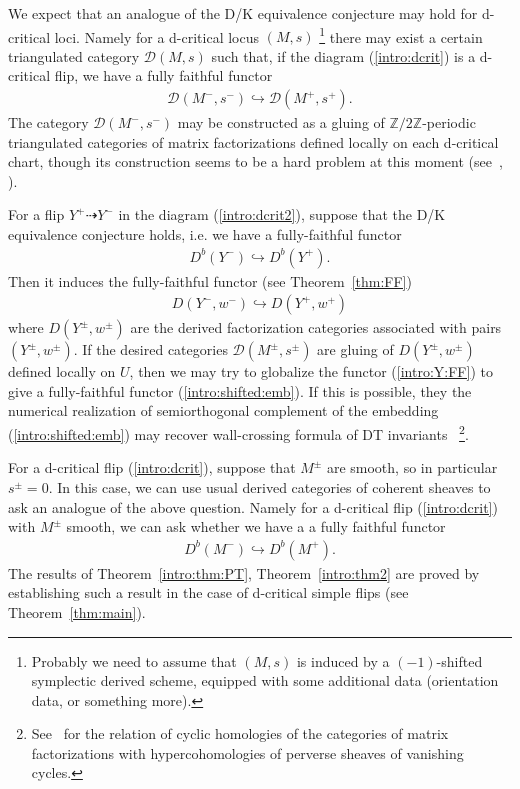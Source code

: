 \documentclass[11pt]{amsart}
\theoremstyle{plain}
\newcommand{\dD}{\mathcal{D}}
\begin{document}
We expect that an analogue of the D/K equivalence 
conjecture 
may hold 
for d-critical 
loci. 
 Namely 
for a d-critical locus $(M, s)$ 
\footnote{Probably we need to assume that 
$(M, s)$ is 
induced by a $(-1)$-shifted symplectic
derived scheme,
equipped 
with some additional data (orientation data, or something more). }
there may exist a certain 
triangulated category $\dD(M, s)$ such that, 
if the diagram (\ref{intro:dcrit}) is a d-critical flip, we have 
a fully faithful functor
\begin{align}\label{intro:shifted:emb}
\dD(M^{-}, s^{-}) \hookrightarrow 
\dD(M^{+}, s^{+}).
\end{align}
The category $\dD(M^{-}, s^{-})$ may be 
constructed as a gluing of 
$\mathbb{Z}/2\mathbb{Z}$-periodic triangulated categories of 
matrix factorizations
defined locally on each d-critical chart, 
though its construction seems to be a hard 
problem at this moment 
(see~\cite[(J)]{Jslide}, \cite[Section~6.1]{MR3728637}). 

For a flip $Y^+ \dashrightarrow Y^-$ 
in the diagram (\ref{intro:dcrit2}), suppose that 
the D/K equivalence conjecture holds, i.e. 
we have a fully-faithful functor 
\begin{align*}
D^b(Y^-) \hookrightarrow D^b(Y^+).
\end{align*}
Then it induces the fully-faithful functor
(see Theorem~\ref{thm:FF})
\begin{align}\label{intro:Y:FF}
D(Y^-, w^-) \hookrightarrow D(Y^+, w^+)
\end{align}
where $D(Y^{\pm}, w^{\pm})$ are the 
derived factorization categories associated with 
pairs $(Y^{\pm}, w^{\pm})$. 
If the desired 
categories $\dD(M^{\pm}, s^{\pm})$ are
gluing of 
$D(Y^{\pm}, w^{\pm})$ defined locally on $U$, 
then we may try to globalize the functor (\ref{intro:Y:FF}) 
to give a fully-faithful functor (\ref{intro:shifted:emb}). 
If this is possible, 
they 
the numerical realization of semiorthogonal complement 
of the embedding (\ref{intro:shifted:emb})
may recover wall-crossing formula of 
DT invariants~\cite{JS, K-S}
\footnote{See~\cite{Eff} for the relation of cyclic homologies of 
the categories of 
matrix factorizations with hypercohomologies of perverse sheaves of vanishing cycles.}.

For a d-critical flip (\ref{intro:dcrit}), 
suppose that $M^{\pm}$ are smooth, 
so in particular $s^{\pm}=0$.
In this case, we can use
usual derived categories of coherent sheaves to ask 
an analogue of the above question. 
Namely for 
a d-critical flip (\ref{intro:dcrit})
with $M^{\pm}$ smooth, 
we can ask whether we have a  
a fully faithful functor
\begin{align*}
D^b(M^-) \hookrightarrow D^b(M^+).
\end{align*}
The results of Theorem~\ref{intro:thm:PT}, Theorem~\ref{intro:thm2}
are proved by establishing 
such a result in the 
case of d-critical simple flips
(see Theorem~\ref{thm:main}). 
\end{document}
